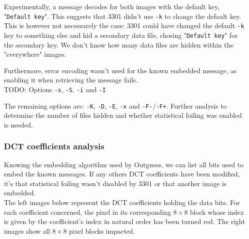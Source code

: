 \documentclass{article}
\begin{document}
Experimentally, a message decodes for both images with the default key, "\texttt{Default key}". This suggests that 3301 didn't use \texttt{-k} to change the default key. This is however not necessarely the case: 3301 could have changed the default \texttt{-k} key to something else and hid a secondary data file, chosing "\texttt{Default key}" for the secondary key. We don't know how many data files are hidden within the "everywhere" images.

Furthermore, error encoding wasn't used for the known embedded message, as enabling it when retrieving the message fails. \\

{\color{red} TODO: Options \texttt{-s}, \texttt{-S}, \texttt{-i} and \texttt{-I}}

The remaining options are: \texttt{-K}, \texttt{-D}, \texttt{-E}, \texttt{-x} and \texttt{-F-}/\texttt{-F+}. Further analysis to determine the number of files hidden and whether statistical foiling was enabled is needed.

\subsubsection{DCT coefficients analysis}

Knowing the embedding algorithm used by Outguess, we can list all bits used to embed the known messages. If any others DCT coefficients have been modified, it's that statistical foiling wasn't disabled by 3301 or that another image is embedded. \\

The left images below represent the DCT coefficients holding the data bits. For each coefficient concerned, the pixel in its corresponding $8\times8$ block whose index is given by the coefficient's index in natural order has been turned red. The right images show all $8\times8$ pixel blocks impacted.
\end{document}

